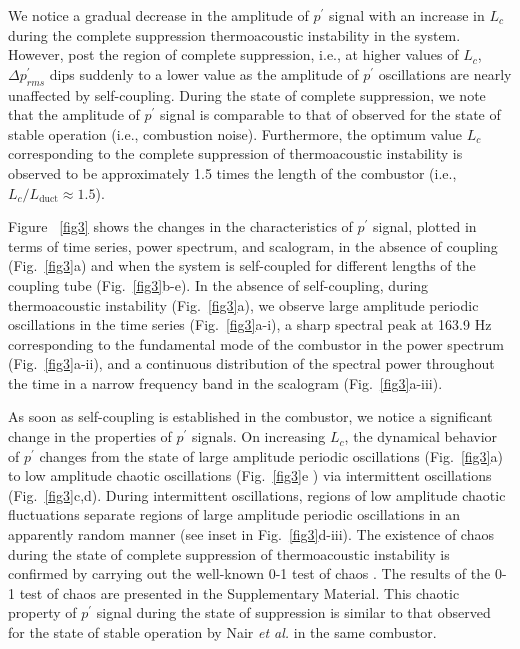 \documentclass[%
preprint,
 amsmath,amssymb,
 aps,
 pra,
]{revtex4-2}
\begin{document}
We notice a gradual decrease in the amplitude of $p^{\prime}$ signal with an increase in $L_c$ during the complete suppression thermoacoustic instability in the system. However, post the region of complete suppression, i.e., at higher values of $L_c$, $\Delta p^\prime_{rms}$ dips suddenly to a lower value as the amplitude of $p^\prime$ oscillations are nearly unaffected by self-coupling. During the state of complete suppression, we note that the amplitude of $p^{\prime}$ signal is comparable to that of observed for the state of stable operation (i.e., combustion noise). Furthermore, the optimum value $L_c$ corresponding to the complete suppression of thermoacoustic instability is observed to be approximately 1.5 times the length of the combustor (i.e., $L_c/L_{\text{duct}} \approx 1.5$).

 Figure ~\ref{fig3} shows the changes in the characteristics of $p^{\prime}$ signal, plotted in terms of time series, power spectrum, and scalogram, in the absence of coupling (Fig.~\ref{fig3}a) and when the system is self-coupled for different lengths of the coupling tube (Fig.~\ref{fig3}b-e). In the absence of self-coupling, during thermoacoustic instability (Fig.~\ref{fig3}a), we observe large amplitude periodic oscillations in the time series (Fig.~\ref{fig3}a-i), a sharp spectral peak at 163.9 Hz corresponding to the fundamental mode of the combustor in the power spectrum (Fig.~\ref{fig3}a-ii), and a continuous distribution of the spectral power throughout the time in a narrow frequency band in the scalogram (Fig.~\ref{fig3}a-iii).

As soon as self-coupling is established in the combustor, we notice a significant change in the properties of $p^{\prime}$ signals. On increasing $L_c$, the dynamical behavior of $p^{\prime}$ changes from the state of large amplitude periodic oscillations (Fig.~\ref{fig3}a) to low amplitude chaotic oscillations (Fig.~\ref{fig3}e ) via intermittent oscillations (Fig.~\ref{fig3}c,d). During intermittent oscillations, regions of low amplitude chaotic fluctuations separate regions of large amplitude periodic oscillations in an apparently random manner (see inset in Fig.~\ref{fig3}d-iii). The existence of chaos during the state of complete suppression of thermoacoustic instability is confirmed by carrying out the well-known 0-1 test of chaos \cite{gottwald2004new}. The results of the 0-1 test of chaos are presented in the Supplementary Material. This chaotic property of $p^{\prime}$ signal during the state of suppression is similar to that observed for the state of stable operation by Nair \textit{et al.} \cite{nair2013loss} in the same combustor. 
\end{document}
